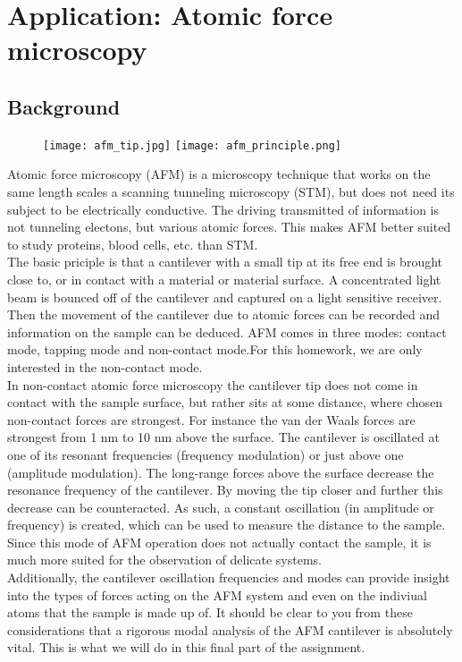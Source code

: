 \documentclass[12pt]{article}
\begin{document}
\section{Application: Atomic force microscopy}
\subsection{Background}
\begin{figure}[ht]
\texttt{[image: afm\_tip.jpg]}
\texttt{[image: afm\_principle.png]}
\end{figure}
Atomic force microscopy (AFM) is a microscopy technique that works on the same length scales a
scanning tunneling microscopy (STM), but does not need its subject to be electrically conductive.
The driving transmitted of information is not tunneling electons, but various atomic forces. This
makes AFM better suited to study proteins, blood cells, etc. than STM.\\


The basic priciple is that a cantilever with a small tip at its free end is brought close to, or in contact
with a material or material surface. A concentrated light beam is bounced off of the cantilever and
captured on a light sensitive receiver. Then the movement of the cantilever due to atomic forces can
be recorded and information on the sample can be deduced.
AFM comes in three modes: contact mode, tapping mode and non-contact mode.For this homework,
we are only interested in the non-contact mode.\\


In non-contact atomic force microscopy the cantilever tip does not come in contact with the sample
surface, but rather sits at some distance, where chosen non-contact forces are strongest. For instance
the van der Waals forces are strongest from 1 nm to 10 nm above the surface. The cantilever is oscillated
at one of its resonant frequencies (frequency modulation) or just above one (amplitude modulation).
The long-range forces above the surface decrease the resonance frequency of the cantilever. By moving
the tip closer and further this decrease can be counteracted. As such, a constant oscillation (in
amplitude or frequency) is created, which can be used to measure the distance to the sample. Since
this mode of AFM operation does not actually contact the sample, it is much more suited for the
observation of delicate systems.\\


Additionally, the cantilever oscillation frequencies and modes can provide insight into the types of
forces acting on the AFM system and even on the indiviual atoms that the sample is made up of.
It should be clear to you from these considerations that a rigorous modal analysis of the AFM cantilever
is absolutely vital. This is what we will do in this final part of the assignment.
\end{document}
